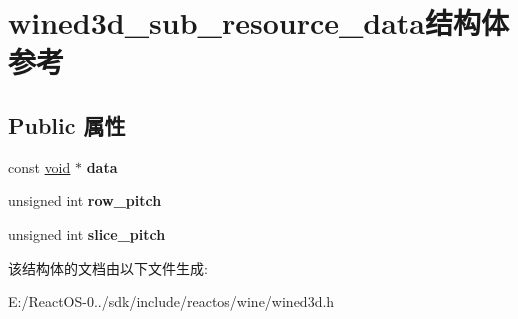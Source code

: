 \hypertarget{structwined3d__sub__resource__data}{}\section{wined3d\+\_\+sub\+\_\+resource\+\_\+data结构体 参考}
\label{structwined3d__sub__resource__data}
\subsection*{Public 属性}
\begin{DoxyCompactItemize}
\item 
\mbox{\label{structwined3d__sub__resource__data_a2c1b3ba26766775a1e80a5d8b016562f}} 
const \hyperlink{interfacevoid}{void} $\ast$ {\bfseries data}
\item 
\mbox{\label{structwined3d__sub__resource__data_ad9395dbe001522031e44ba9b7fc1507a}} 
unsigned int {\bfseries row\+\_\+pitch}
\item 
\mbox{\label{structwined3d__sub__resource__data_adda57a02b84267de065d002eca37f273}} 
unsigned int {\bfseries slice\+\_\+pitch}
\end{DoxyCompactItemize}


该结构体的文档由以下文件生成\+:\begin{DoxyCompactItemize}
\item 
E\+:/\+React\+O\+S-\/0../sdk/include/reactos/wine/wined3d.\+h\end{DoxyCompactItemize}
